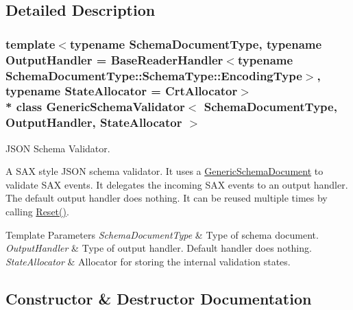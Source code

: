 \subsection{Detailed Description}
\subsubsection*{template$<$typename Schema\+Document\+Type, typename Output\+Handler = Base\+Reader\+Handler$<$typename Schema\+Document\+Type\+::\+Schema\+Type\+::\+Encoding\+Type$>$, typename State\+Allocator = Crt\+Allocator$>$\\*
class Generic\+Schema\+Validator$<$ Schema\+Document\+Type, Output\+Handler, State\+Allocator $>$}

J\+S\+ON Schema Validator. 

A S\+AX style J\+S\+ON schema validator. It uses a {\ttfamily \hyperlink{classGenericSchemaDocument}{Generic\+Schema\+Document}} to validate S\+AX events. It delegates the incoming S\+AX events to an output handler. The default output handler does nothing. It can be reused multiple times by calling {\ttfamily \hyperlink{classGenericSchemaValidator_a49efbbe098cb77728be3d48cafed17e4}{Reset()}}.


\begin{DoxyTemplParams}{Template Parameters}
{\em Schema\+Document\+Type} & Type of schema document. \\
\hline
{\em Output\+Handler} & Type of output handler. Default handler does nothing. \\
\hline
{\em State\+Allocator} & Allocator for storing the internal validation states. \\
\hline
\end{DoxyTemplParams}


\subsection{Constructor \& Destructor Documentation}

